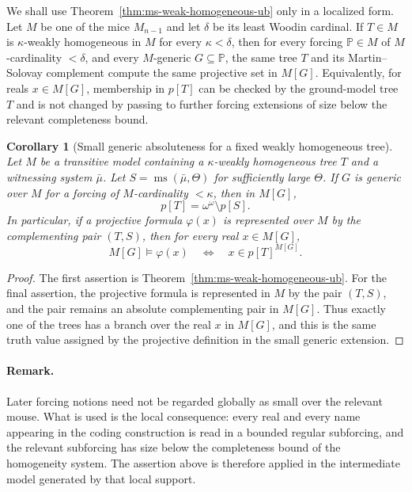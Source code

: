 \documentclass[a4paper,11pt]{article}
\newtheorem{corollary}[theorem]{Corollary}
\begin{document}
We shall use Theorem~\ref{thm:ms-weak-homogeneous-ub} only in a localized form.  Let $M$ be one of the mice $M_{n-1}$ and let $\delta$ be its least Woodin cardinal.  If $T\in M$ is $\kappa$-weakly homogeneous in $M$ for every $\kappa<\delta$, then for every forcing $\mathbb P\in M$ of $M$-cardinality $<\delta$, and every $M$-generic $G\subseteq\mathbb P$, the same tree $T$ and its Martin--Solovay complement compute the same projective set in $M[G]$.  Equivalently, for reals $x\in M[G]$, membership in $p[T]$ can be checked by the ground-model tree $T$ and is not changed by passing to further forcing extensions of size below the relevant completeness bound.

\begin{corollary}[Small generic absoluteness for a fixed weakly homogeneous tree]\label{cor:small-generic-absoluteness-fixed-tree}
Let $M$ be a transitive model containing a $\kappa$-weakly homogeneous tree $T$ and a witnessing system $\bar\mu$.  Let $S=\operatorname{ms}(\bar\mu,\Theta)$ for sufficiently large $\Theta$.  If $G$ is generic over $M$ for a forcing of $M$-cardinality $<\kappa$, then in $M[G]$,
\[
   p[T]=\omega^\omega\setminus p[S].
\]
In particular, if a projective formula $\varphi(x)$ is represented over $M$ by the complementing pair $(T,S)$, then for every real $x\in M[G]$,
\[
   M[G]\models \varphi(x)
   \quad\Longleftrightarrow\quad
   x\in p[T]^{M[G]} .
\]
\end{corollary}

\begin{proof}
The first assertion is Theorem~\ref{thm:ms-weak-homogeneous-ub}.  For the final assertion, the projective formula is represented in $M$ by the pair $(T,S)$, and the pair remains an absolute complementing pair in $M[G]$.  Thus exactly one of the trees has a branch over the real $x$ in $M[G]$, and this is the same truth value assigned by the projective definition in the small generic extension.
\end{proof}

\paragraph{Remark.}\label{rem:localized-smallness-of-absoluteness}
Later forcing notions need not be regarded globally as small over the relevant mouse.  What is used is the local consequence: every real and every name appearing in the coding construction is read in a bounded regular subforcing, and the relevant subforcing has size below the completeness bound of the homogeneity system.  The assertion above is therefore applied in the intermediate model generated by that local support.
\end{document}
